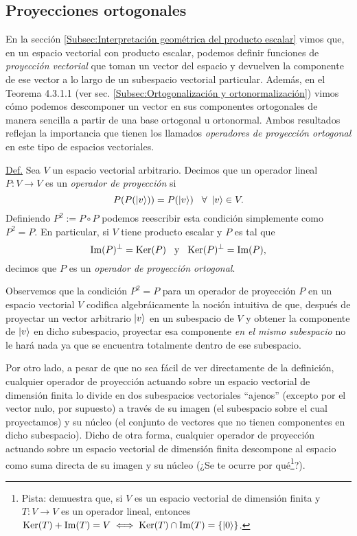 \documentclass[12pt,dvipsnames]{article}
\begin{document}
\newpage
\subsection{Proyecciones ortogonales}

En la sección \ref{Subsec:Interpretación geométrica del producto escalar} vimos que, en un espacio vectorial con producto escalar, podemos definir funciones de \emph{proyección vectorial} que toman un vector del espacio y devuelven la componente de ese vector a lo largo de un subespacio vectorial particular. Además, en el Teorema 4.3.1.1 (ver sec. \ref{Subsec:Ortogonalización y ortonormalización}) vimos cómo podemos descomponer un vector en sus componentes ortogonales de manera sencilla a partir de una base ortogonal u ortonormal. Ambos resultados reflejan la importancia que tienen los llamados \emph{operadores de proyección ortogonal} en este tipo de espacios vectoriales.

\begin{tcolorbox}
    \underline{Def.} Sea $V$ un espacio vectorial arbitrario. Decimos que un operador lineal $P:V\to V$ es un \emph{operador de proyección} si \[
        P(P(\ket{v}))=P(\ket{v}) \hspace{3mm} \forall \ \ket{v}\in V.
    \] Definiendo $P^2:=P\circ P$ podemos reescribir esta condición simplemente como $P^2=P$. En particular, si $V$ tiene producto escalar y $P$ es tal que \[
        \text{Im}(P)^\perp=\text{Ker}(P)\hspace{3mm}\text{y}\hspace{3mm}\text{Ker}(P)^\perp=\text{Im}(P),
    \] decimos que $P$ es un \emph{operador de proyección ortogonal}.
\end{tcolorbox}

Observemos que la condición $P^2=P$ para un operador de proyección $P$ en un espacio vectorial $V$ codifica algebráicamente la noción intuitiva de que, después de proyectar un vector arbitrario $\ket{v}$ en un subespacio de $V$ y obtener la componente de $\ket{v}$ en dicho subespacio, proyectar esa componente \emph{en el mismo subespacio} no le hará nada \textemdash ya que se encuentra totalmente dentro de ese subespacio.

\vspace{3mm}
Por otro lado, a pesar de que no sea fácil de ver directamente de la definición, cualquier operador de proyección actuando sobre un espacio vectorial de dimensión finita lo divide en dos subespacios vectoriales ``ajenos'' (excepto por el vector nulo, por supuesto) a través de su imagen (el subespacio sobre el cual proyectamos) y su núcleo (el conjunto de vectores que no tienen componentes en dicho subespacio). Dicho de otra forma, cualquier operador de proyección actuando sobre un espacio vectorial de dimensión finita descompone al espacio como suma directa de su imagen y su núcleo (¿Se te ocurre por qué\footnote{Pista: demuestra que, si $V$ es un espacio vectorial de dimensión finita y $T:V\to V$ es un operador lineal, entonces $\text{Ker}(T)+\text{Im}(T)=V \iff \text{Ker}(T)\cap\text{Im}(T)=\{\ket{0}\}$.}?). 
\end{document}
